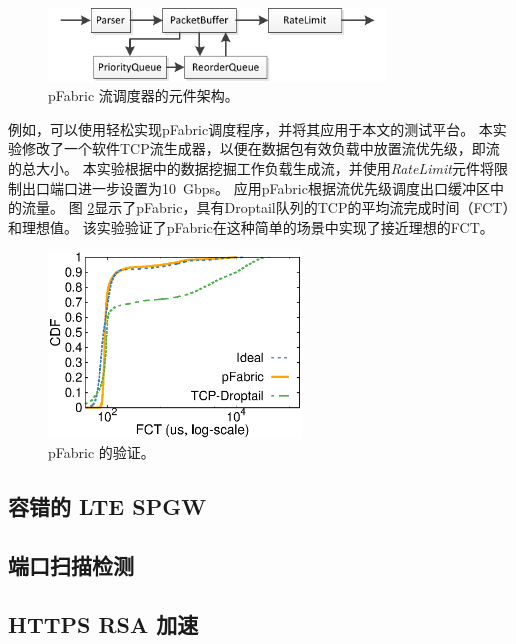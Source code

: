 \begin{figure}[htbp]
	\centering
	\includegraphics[width=0.8\textwidth]{image/PFabric}
	\caption{pFabric 流调度器的元件架构。}
	\label{clicknp:fig:pfabric-arch}
\end{figure}

例如，可以使用\name 轻松实现pFabric调度程序\cite {pfabric}，并将其应用于本文的测试平台。
本实验修改了一个软件TCP流生成器\cite {mqecn}，以便在数据包有效负载中放置流优先级，即流的总大小。
本实验根据\cite {pfabric}中的数据挖掘工作负载生成流，并使用\textit {RateLimit}元件将限制出口端口进一步设置为10~Gbps。
应用pFabric根据流优先级调度出口缓冲区中的流量。
图 \ref {clicknp:fig:pfabric}显示了pFabric，具有Droptail队列的TCP的平均流完成时间（FCT）和理想值。
该实验验证了pFabric在这种简单的场景中实现了接近理想的FCT。

\begin{figure}[htbp]
	\centering
	\includegraphics[width=0.6\textwidth]{eval/pfabric}
	\caption{pFabric 的验证。}
	\label{clicknp:fig:pfabric}
\end{figure}

\subsection{容错的 LTE SPGW}

\subsection{端口扫描检测}

\subsection{HTTPS RSA 加速}

